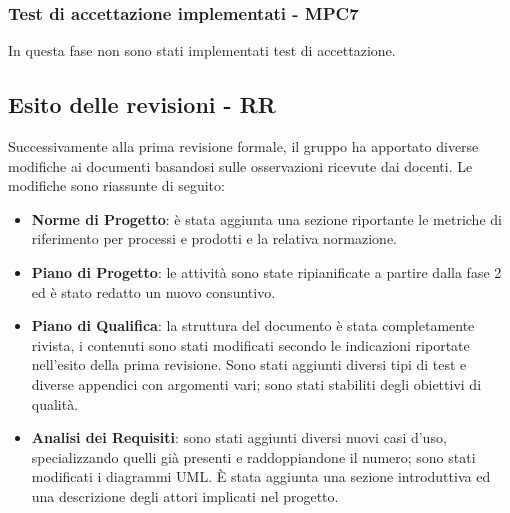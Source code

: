 \subsubsection{Test di accettazione implementati - MPC7}
In questa fase non sono stati implementati test di accettazione.
\newpage
\subsection{Esito delle revisioni - RR}
Successivamente alla prima revisione formale, il gruppo ha apportato diverse modifiche ai documenti basandosi sulle osservazioni ricevute dai docenti. Le modifiche sono riassunte di seguito:
	\begin{itemize}
		\item \textbf{Norme di Progetto}: è stata aggiunta una sezione riportante le metriche di riferimento per processi e prodotti e la relativa normazione. 
		\item \textbf{Piano di Progetto}: le attività sono state ripianificate a partire dalla fase 2 ed è stato redatto un nuovo consuntivo.
		\item \textbf{Piano di Qualifica}: la struttura del documento è stata completamente rivista, i contenuti sono stati modificati secondo le indicazioni riportate nell'esito della prima revisione. Sono stati aggiunti diversi tipi di test e diverse appendici con argomenti vari; sono stati stabiliti degli obiettivi di qualità.
		\item \textbf{Analisi dei Requisiti}: sono stati aggiunti diversi nuovi casi d'uso, specializzando quelli già presenti e raddoppiandone il numero; sono stati modificati i diagrammi UML. \`E stata aggiunta una sezione introduttiva ed una descrizione degli attori implicati nel progetto. 
	\end{itemize}

